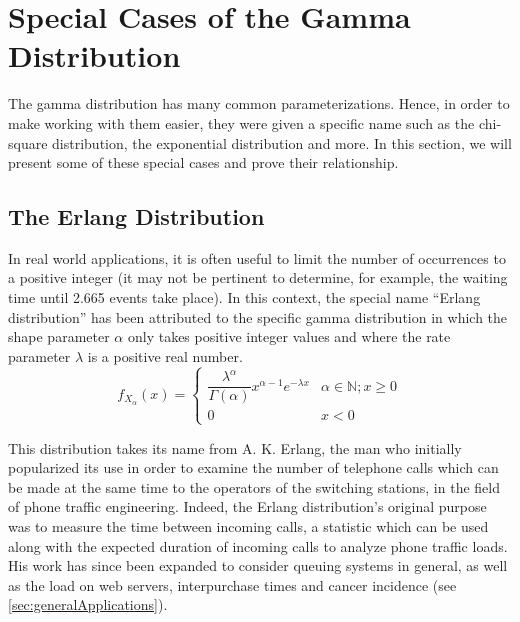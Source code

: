 \documentclass[12pt]{article}
\begin{document}
\pagebreak
\section{Special Cases of the Gamma Distribution}
The gamma distribution has many common parameterizations. Hence, in order to make working with them easier, they were
given a specific name such as the chi-square distribution, the exponential distribution and more. In this section, we
will present some of these special cases and prove their relationship.

\subsection{The Erlang Distribution}\label{subsec:specialcases:erlang}
In real world applications, it is often useful to limit the number of occurrences to a positive integer (it may not be
pertinent to determine, for example, the waiting time until 2.665 events take place). In this context, the special name
“Erlang distribution” has been attributed to the specific gamma distribution in which the shape parameter $\alpha$ only
takes positive integer values and where the rate parameter $\lambda$ is a positive real number.
\begin{equation}
	f_{X_\alpha}(x)	= 	\begin{cases}
							\dfrac{\lambda^\alpha}{\Gamma(\alpha)}x^{\alpha-1}e^{-\lambda x}  & \alpha\in\mathbb{N}; x\geq0\\
							0  & x<0
  						\end{cases}
\end{equation}

This distribution takes its name from A. K. Erlang, the man who initially popularized its use in order to examine the
number of telephone calls which can be made at the same time to the operators of the switching stations, in the field of
phone traffic engineering. Indeed, the Erlang distribution's original purpose was to measure the time between incoming
calls, a statistic which can be used along with the expected duration of incoming calls to analyze phone traffic loads.
His work has since been expanded to consider queuing systems in general, as well as the load on web servers,
interpurchase times and cancer incidence (see \autoref{sec:generalApplications})\cite{zachWhatErlangDistribution2020}.

\end{document}
